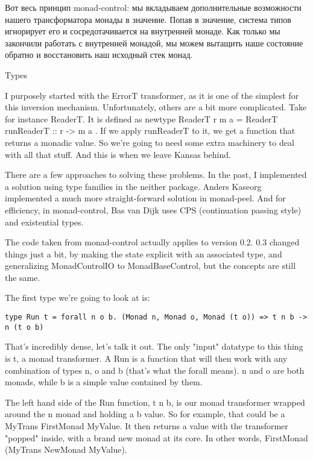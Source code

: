 Вот весь принцип monad-control: мы вкладываем дополнительные возможности нашего трансформатора монады в значение. Попав в значение, система типов игнорирует его и сосредотачивается на внутренней монаде. Как только мы закончили работать с внутренней монадой, мы можем вытащить наше состояние обратно и восстановить наш исходный стек монад.

Types

I purposely started with the ErrorT transformer, as it is one of the simplest for this inversion mechanism. Unfortunately, others are a bit more complicated. Take for instance ReaderT. It is defined as newtype ReaderT r m a = ReaderT { runReaderT :: r -> m a }. If we apply runReaderT to it, we get a function that returns a monadic value. So we're going to need some extra machinery to deal with all that stuff. And this is when we leave Kansas behind.

There are a few approaches to solving these problems. In the past, I implemented a solution using type families in the neither package. Anders Kaseorg implemented a much more straight-forward solution in monad-peel. And for efficiency, in monad-control, Bas van Dijk uses CPS (continuation passing style) and existential types.

The code taken from monad-control actually applies to version 0.2. 0.3 changed things just a bit, by making the state explicit with an associated type, and generalizing MonadControlIO to MonadBaseControl, but the concepts are still the same.

The first type we're going to look at is:

\begin{lstlisting}
type Run t = forall n o b. (Monad n, Monad o, Monad (t o)) => t n b -> n (t o b)
\end{lstlisting}

That's incredibly dense, let's talk it out. The only "input" datatype to this thing is t, a monad transformer. A Run is a function that will then work with any combination of types n, o and b (that's what the forall means). n and o are both monads, while b is a simple value contained by them.

The left hand side of the Run function, t n b, is our monad transformer wrapped around the n monad and holding a b value. So for example, that could be a MyTrans FirstMonad MyValue. It then returns a value with the transformer "popped" inside, with a brand new monad at its core. In other words, FirstMonad (MyTrans NewMonad MyValue).

